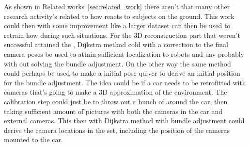 \indent  As shown in Related works~\ref{sec:related_work} there aren't that many other research activity's related to how \openposeS reacts to subjects on the ground.
This work could then with some improvement like a larger dataset can then be used to retrain how \openposeS during such situations.
For the 3D reconstruction part that weren't successful attained the \arucoS, Dijkstra method  cold with a correction to the final camera poses be used to attain sufficient localization to robots and \ac{uav} probably with out solving the bundle adjustment.
On the other way the same method could perhaps be used to make a initial pose quiver to derive an initial position for the bundle adjustment.
The idea could be if a car needs to be retrofitted with cameras that's going to make a 3D approximation of the environment.
The calibration step could just be to throw out a bunch of \arucoS around the car, then taking sufficient amount of pictures with both the cameras in the car and external cameras.
This then with  Dijkstra method with bundle adjustment could derive the camera locations in the set, including the position of the cameras mounted to the car.





